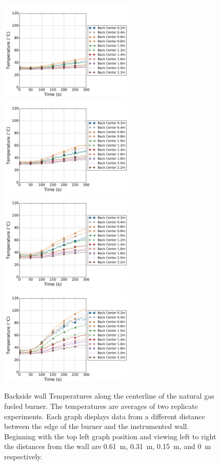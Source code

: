 \documentclass[twoside]{uocthesis}
\begin{document}
{\begin{figure}[ht!]
	\centering
	\includegraphics[width=2.5in]{../Figures/TWNG01_TC_Back_Center_Avg}
	\includegraphics[width=2.5in]{../Figures/TWNG03_TC_Back_Center_Avg}\\
	\includegraphics[width=2.5in]{../Figures/TWNG05_TC_Back_Center_Avg}
	\includegraphics[width=2.5in]{../Figures/TWNG07_TC_Back_Center_Avg}\\
	\caption[Backside wall Temperatures along the centerline of the natural gas fueled burner]{Backside wall Temperatures along the centerline of the natural gas fueled burner. The temperatures are averages of two replicate experiments. Each graph displays data from a different distance between the edge of the burner and the instrumented wall. Beginning with the top left graph position and viewing left to right the distances from the wall are 0.61~m, 0.31~m, 0.15~m, and 0~m respectively.}
	\label{TC_Back_Center_TWNG_comp}
\end{figure}

}
\end{document}
